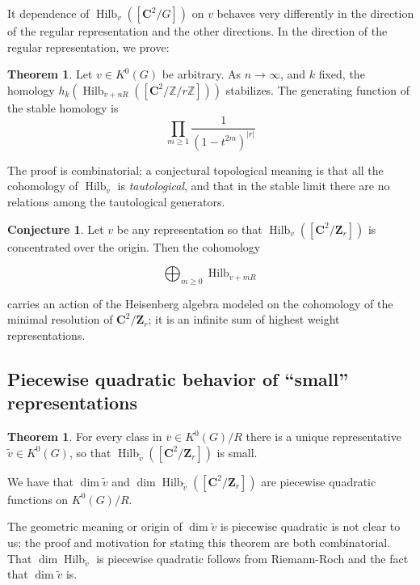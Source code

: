 \documentclass{amsart}[12pt]
\theoremstyle{definition}
\newtheorem{theorem}[dummy]{Theorem}
\newtheorem{conjecture}[dummy]{Conjecture}
\newcommand{\Z}{\mathbf{Z}}
\newcommand{\C}{\mathbf{C}}
\DeclareMathOperator{\Hilb}{Hilb}
\begin{document}
It dependence of $\Hilb_v([\C^2/G])$ on $v$ behaves very differently in the direction of the regular representation and the other directions.  In the direction of the regular representation, we prove:

\begin{theorem}
Let $v\in K^0(G)$ be arbitrary.  As $n\to \infty$, and $k$ fixed, the homology $h_k(\Hilb_{v+nR}([\C^2/\mathbb{Z}/r\mathbb{Z}]))$ stabilizes.  The generating function of the stable homology is
$$\prod_{m\geq 1} \frac{1}{(1-t^{2m})^{|r|}}$$
\end{theorem}

The proof is combinatorial; a conjectural topological meaning is that all the cohomology of $\Hilb_v$ is \emph{tautological}, and that in the stable limit there are no relations among the tautological generators.



\begin{conjecture}
Let $v$ be any representation so that $\Hilb_v([\C^2/\Z_r])$ is concentrated over the origin.  Then the cohomology

$$\bigoplus_{m\geq 0} \Hilb_{v+mR} $$ 

carries an action of the Heisenberg algebra modeled on the cohomology of the minimal resolution of $\C^2/\Z_r$; it is an infinite sum of highest weight representations.

\end{conjecture}

\subsection{Piecewise quadratic behavior of ``small'' representations}


\begin{theorem}
For every class in $\overline{v}\in K^0(G)/R$ there is a unique representative $\tilde{v}\in K^0(G)$, so that $\Hilb_{\tilde{v}}([\C^2/\Z_r])$ is small.  

We have that $\dim \tilde{v}$ and $\dim \Hilb_{\tilde{v}}([\C^2/\Z_r])$ are piecewise quadratic functions on $K^0(G)/R$.
\end{theorem}

The geometric meaning or origin of $\dim \tilde{v}$ is piecewise quadratic is not clear to us; the proof and motivation for stating this theorem are both combinatorial.  That $\dim \Hilb_{\tilde{v}}$ is piecewise quadratic follows from Riemann-Roch and the fact that $\dim \tilde{v}$ is.    
\end{document}
